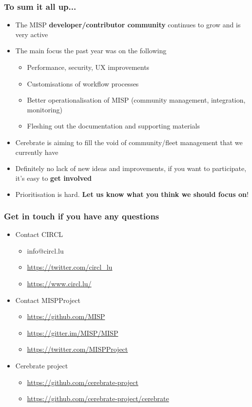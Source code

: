 \begin{frame}
  \frametitle{To sum it all up...}
  \begin{itemize}
     \item The MISP {\bf developer/contributor community} continues to grow and is very active
     \item The main focus the past year was on the following
     \begin{itemize}
          \item Performance, security, UX improvements
          \item Customisations of workflow processes
          \item Better operationalisation of MISP (community management, integration, monitoring)
          \item Fleshing out the documentation and supporting materials
     \end{itemize}
     \item Cerebrate is aiming to fill the void of community/fleet management that we currently have
     \item Definitely no lack of new ideas and improvements, if you want to participate, it's easy to {\bf get involved}
     \item Prioritisation is hard. {\bf Let us know what you think we should focus on}!
  \end{itemize}
\end{frame}

\begin{frame}
  \frametitle{Get in touch if you have any questions}
  \begin{itemize}
    \item Contact CIRCL
    \begin{itemize}
      \item info@circl.lu
      \item \url{https://twitter.com/circl_lu}
      \item \url{https://www.circl.lu/}
    \end{itemize}
    \item Contact MISPProject 
    \begin{itemize}
      \item \url{https://github.com/MISP}
      \item \url{https://gitter.im/MISP/MISP}
      \item \url{https://twitter.com/MISPProject}
    \end{itemize}
    \item Cerebrate project
    \begin{itemize}
      \item \url{https://github.com/cerebrate-project}
      \item \url{https://github.com/cerebrate-project/cerebrate}
    \end{itemize}
  \end{itemize}
\end{frame}
